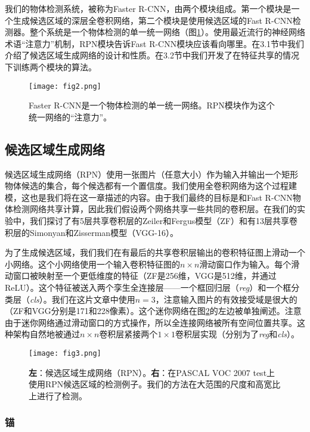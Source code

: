 \documentclass[../main.tex]{subfile}
\begin{document}
我们的物体检测系统，被称为Faster R-CNN，由两个模块组成。第一个模块是一个生成候选区域的深层全卷积网络，第二个模块是使用候选区域的Fast R-CNN检测器\cite{fastrcnn}。整个系统是一个物体检测的单一统一网络（图\ref{fig:img2}）。使用最近流行的神经网络术语“注意力”机制，RPN模块告诉Fast R-CNN模块应该看向哪里。在3.1节中我们介绍了候选区域生成网络的设计和性质。在3.2节中我们开发了在特征共享的情况下训练两个模块的算法。

\begin{figure}[bh]
    \centering
    \texttt{[image: fig2.png]}
    \label{fig:img2}
    \caption{Faster R-CNN是一个物体检测的单一统一网络。RPN模块作为这个统一网络的“注意力”。}
\end{figure}

\subsection{候选区域生成网络}

候选区域生成网络（RPN）使用一张图片（任意大小）作为输入并输出一个矩形物体候选的集合，每个候选都有一个置信度。我们使用全卷积网络\cite{fcn}为这个过程建模，这也是我们将在这一章描述的内容。由于我们最终的目标是和Fast R-CNN物体检测网络\cite{fastrcnn}共享计算，因此我们假设两个网络共享一些共同的卷积层。在我们的实验中，我们探讨了有5层共享卷积层的Zeiler和Fergus模型\cite{zf}（ZF）和有13层共享卷积层的Simonyan和Zisserman模型\cite{vgg}（VGG-16）。

为了生成候选区域，我们我们在有最后的共享卷积层输出的卷积特征图上滑动一个小网络。这个小网络使用一个输入卷积特征图的$n\times n$滑动窗口作为输入。每个滑动窗口被映射至一个更低维度的特征（ZF是256维，VGG是512维，并通过ReLU\cite{relu}）。这个特征被送入两个孪生全连接层——一个框回归层（\textit{reg}）和一个框分类层（\textit{cls}）。我们在这片文章中使用$n=3$，注意输入图片的有效接受域是很大的（ZF和VGG分别是171和228像素）。这个迷你网络在图\ref{fig:img3}的左边被单独阐述。注意由于迷你网络通过滑动窗口的方式操作，所以全连接网络被所有空间位置共享。这种架构自然地被通过$n \times n$卷积层紧接两个$1\times 1$卷积层实现（分别为了\textit{reg}和\textit{cls}）。

\begin{figure}[bh]
    \centering
    \texttt{[image: fig3.png]}
    \label{fig:img3}
    \caption{\textbf{左}：候选区域生成网络（RPN）。\textbf{右}：在PASCAL VOC 2007 test上使用RPN候选区域的检测例子。我们的方法在大范围的尺度和高宽比上进行了检测。}
\end{figure}

\subsubsection{锚}
\end{document}
